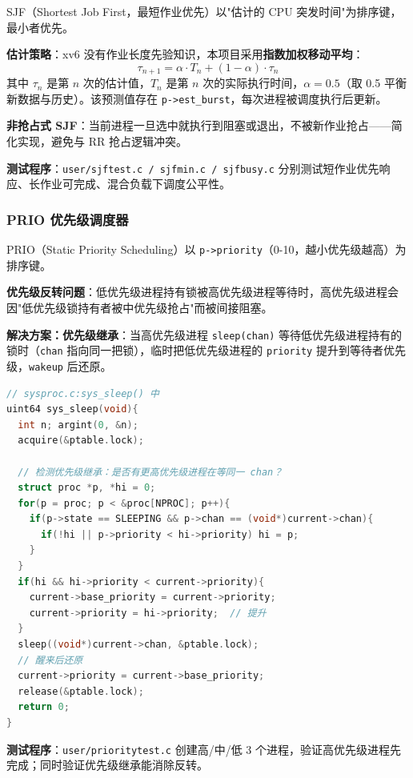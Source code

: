 \documentclass[12pt,a4paper]{ctexart}
\begin{document}
SJF（Shortest Job First，最短作业优先）以"估计的 CPU 突发时间"为排序键，最小者优先。

\textbf{估计策略}：xv6 没有作业长度先验知识，本项目采用\textbf{指数加权移动平均}：
\[
\tau_{n+1} = \alpha \cdot T_n + (1-\alpha) \cdot \tau_n
\]
其中 $\tau_n$ 是第 $n$ 次的估计值，$T_n$ 是第 $n$ 次的实际执行时间，$\alpha = 0.5$（取 0.5 平衡新数据与历史）。该预测值存在 \texttt{p->est\_burst}，每次进程被调度执行后更新。

\textbf{非抢占式 SJF}：当前进程一旦选中就执行到阻塞或退出，不被新作业抢占——简化实现，避免与 RR 抢占逻辑冲突。

\textbf{测试程序}：\texttt{user/sjftest.c / sjfmin.c / sjfbusy.c} 分别测试短作业优先响应、长作业可完成、混合负载下调度公平性。

\subsubsection{PRIO 优先级调度器}

PRIO（Static Priority Scheduling）以 \texttt{p->priority}（0-10，越小优先级越高）为排序键。

\textbf{优先级反转问题}：低优先级进程持有锁被高优先级进程等待时，高优先级进程会因"低优先级锁持有者被中优先级抢占"而被间接阻塞。

\textbf{解决方案：优先级继承}：当高优先级进程 \texttt{sleep(chan)} 等待低优先级进程持有的锁时（\texttt{chan} 指向同一把锁），临时把低优先级进程的 \texttt{priority} 提升到等待者优先级，\texttt{wakeup} 后还原。

\begin{lstlisting}[language=C, caption={优先级继承（简化）}]
// sysproc.c:sys_sleep() 中
uint64 sys_sleep(void){
  int n; argint(0, &n);
  acquire(&ptable.lock);

  // 检测优先级继承：是否有更高优先级进程在等同一 chan？
  struct proc *p, *hi = 0;
  for(p = proc; p < &proc[NPROC]; p++){
    if(p->state == SLEEPING && p->chan == (void*)current->chan){
      if(!hi || p->priority < hi->priority) hi = p;
    }
  }
  if(hi && hi->priority < current->priority){
    current->base_priority = current->priority;
    current->priority = hi->priority;  // 提升
  }
  sleep((void*)current->chan, &ptable.lock);
  // 醒来后还原
  current->priority = current->base_priority;
  release(&ptable.lock);
  return 0;
}
\end{lstlisting}

\textbf{测试程序}：\texttt{user/prioritytest.c} 创建高/中/低 3 个进程，验证高优先级进程先完成；同时验证优先级继承能消除反转。
\end{document}
